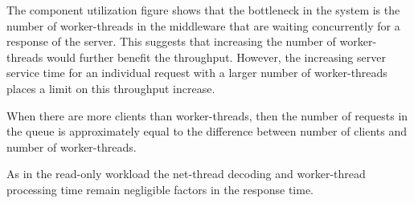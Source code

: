 \documentclass[11pt,a4paper]{article}
\begin{document}
The component utilization figure shows that the bottleneck in the system is the number of worker-threads in the middleware that are waiting concurrently for a response of the server. This suggests that increasing the number of worker-threads would further benefit the throughput. However, the increasing server service time for an individual request with a larger number of worker-threads places a limit on this throughput increase.

When there are more clients than worker-threads, then the number of requests in the queue is approximately equal to the difference between number of clients and number of worker-threads.

As in the read-only workload the net-thread decoding and worker-thread processing time remain negligible factors in the response time.
\end{document}
